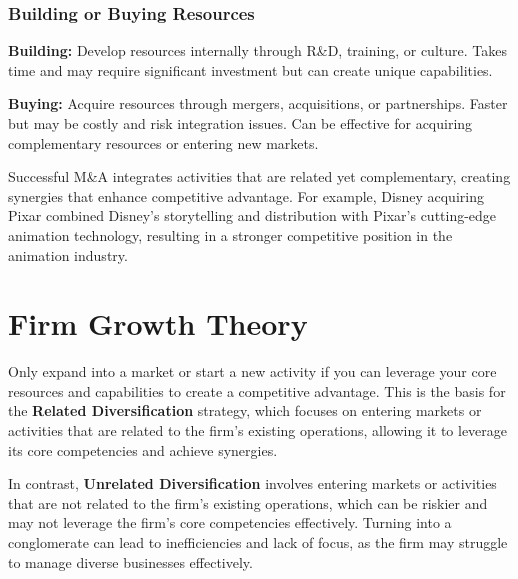 \subsubsection{Building or Buying Resources}
\textbf{Building:} Develop resources internally through R\&D, training, or culture.
Takes time and may require significant investment but can create unique
capabilities.

\textbf{Buying:} Acquire resources through mergers, acquisitions, or partnerships.
Faster but may be costly and risk integration issues. Can be effective for
acquiring complementary resources or entering new markets.

\begin{callout}
    Successful M\&A integrates activities that are related yet complementary,
    creating synergies that enhance competitive advantage. For example, Disney
    acquiring Pixar combined Disney's storytelling and distribution with Pixar's
    cutting-edge animation technology, resulting in a stronger competitive position
    in the animation industry.
\end{callout}

\section{Firm Growth Theory}
Only expand into a market or start a new activity if you can leverage your core
resources and capabilities to create a competitive advantage. This is the basis
for the \textbf{Related Diversification} strategy, which focuses on entering markets or
activities that are related to the firm's existing operations, allowing it to
leverage its core competencies and achieve synergies.

In contrast, \textbf{Unrelated Diversification} involves entering markets or activities that are not
related to the firm's existing operations, which can be riskier and may not
leverage the firm's core competencies effectively. Turning into a conglomerate
can lead to inefficiencies and lack of focus, as the firm may struggle to
manage diverse businesses effectively.

